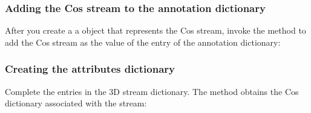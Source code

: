 \documentclass[letterpaper,12pt,english,openany,oneside]{sphinxmanual}
\begin{document}
\begin{sphinxVerbatim}[commandchars=\\\{\}]
        
  
\end{sphinxVerbatim}


\subsubsection{Adding the Cos stream to the annotation dictionary}
\label{\detokenize{Plugins_3D_samples:adding-the-cos-stream-to-the-annotation-dictionary}}
After you create a a  object that represents the Cos stream, invoke the  method to add the Cos stream as the value of the  entry of the annotation dictionary:

\begin{sphinxVerbatim}[commandchars=\\\{\}]
       
                               
                                  
\end{sphinxVerbatim}


\subsubsection{Creating the attributes dictionary}
\label{\detokenize{Plugins_3D_samples:creating-the-attributes-dictionary}}
Complete the entries in the 3D stream dictionary. The  method obtains the Cos dictionary associated with the stream:

\begin{sphinxVerbatim}[commandchars=\\\{\}]
   
\end{sphinxVerbatim}
\end{document}
